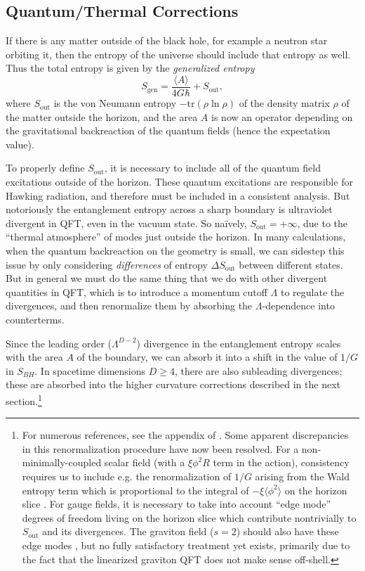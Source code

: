 \documentclass[12pt]{article}
\def\be{\begin{equation}}
\def\ee{\end{equation}}
\begin{document}
\subsection{Quantum/Thermal Corrections} \label{sec:quantumentropy}
If there is any matter outside of the black hole, for example a neutron star orbiting it, then the entropy of the universe should include that entropy as well. Thus the total entropy is given by the \textit{generalized entropy}
\be\label{genS}
S_{\text{gen}} = \frac{\langle A \rangle}{4G \hbar} + S_{\text{out}},
\ee
where $S_{\text{out}}$ is the von Neumann entropy $-\mathrm{tr}\left(\rho \ln \rho \right)$ of the density matrix $\rho$ of the matter outside the horizon, and the area $A$ is now an operator depending on the gravitational backreaction of the quantum fields (hence the expectation value).

To properly define $S_{\text{out}}$, it is necessary to include all of the quantum field excitations outside of the horizon. These quantum excitations are responsible for Hawking radiation, and therefore must be included in a consistent analysis. But notoriously the entanglement entropy across a sharp boundary is ultraviolet divergent in QFT, even in the vacuum state. So na\"{i}vely, $S_{\text{out}} = + \infty$, due to the ``thermal atmosphere'' of modes just outside the horizon. In many calculations, when the quantum backreaction on the geometry is small, we can sidestep this issue by only considering \emph{differences} of entropy $\Delta S_{\text{out}}$ between different states. But in general we must do the same thing that we do with other divergent quantities in QFT, which is to introduce a momentum cutoff $\Lambda$ to regulate the divergences, and then renormalize them by absorbing the $\Lambda$-dependence into counterterms.

Since the leading order ($\Lambda^{D-2}$) divergence in the entanglement entropy scales with the area $A$ of the boundary, we can absorb it into a shift in the value of $1/G$ in $S_{BH}$. In spacetime dimensions $D \geq 4$, there are also subleading divergences; these are absorbed into the higher curvature corrections described in the next section.\footnote{For numerous references, see the appendix of \cite{bousso2016quantum}.  Some apparent discrepancies in this renormalization procedure have now been resolved.  For a non-minimally-coupled scalar field (with a $\xi \phi^2 R$ term in the action), consistency requires us to include e.g. the renormalization of $1/G$ arising from the Wald entropy term which is proportional to the integral of $-\xi \langle \phi^2 \rangle$ on the horizon slice \cite{ford2001classical}.  For gauge fields, it is necessary to take into account ``edge mode'' degrees of freedom living on the horizon slice \cite{casini2014remarks,donnelly2014entanglement,donnelly2015entanglement,donnelly2016geometric,jafferis2016relative} which contribute nontrivially to $S_\mathrm{out}$ and its divergences.  The graviton field ($s = 2$) should also have these edge modes \cite{jafferis2016relative}, but no fully satisfactory treatment yet exists, primarily due to the fact that the linearized graviton QFT does not make sense off-shell.}
\end{document}
